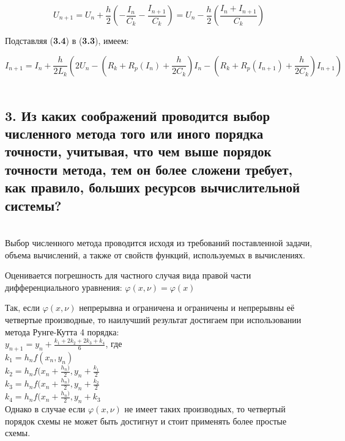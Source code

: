 \begin{equation}
    U_{n + 1} = U_{n} + \frac{h}{2}(-\frac{I_{n}}{C_{k}} -\frac{I_{n + 1}}{C_{k}}) = U_{n} - \frac{h}{2}(\frac{I_{n} + I_{n + 1}}{C_{k}})
\end{equation}

Подставляя (\textbf{3.4}) в (\textbf{3.3}), имеем:

\begin{equation}
    I_{n + 1} = I_{n} + \frac{h}{2L_{k}}(2U_{n} -  (R_{k} + R_{p}(I_{n}) + \frac{h}{2C_{k}})I_{n} - (R_{k} + R_{p}(I_{n + 1}) + \frac{h}{2C_{k}})I_{n+1})
\end{equation}\\

\subsection*{3. Из каких соображений проводится выбор численного метода того или иного порядка точности, учитывая, что чем выше порядок точности метода, тем он более сложени требует, как правило, больших ресурсов вычислительной системы?}\\

Выбор численного метода проводится исходя из требований поставленной задачи, объема вычислений, а также от свойств функций, используемых в вычислениях.

Оценивается погрешность для частного случая вида правой части дифференциального уравнения: $\varphi (x, \nu) = \varphi(x)$

Так, если $\varphi (x, \nu)$ непрерывна и ограничена и ограничены и непрерывны её четвертые производные, то наилучший результат достигаем при использовании метода Рунге-Кутта 4 порядка:\\

$y_{n + 1} = y_{n} + \frac{k_{1} + 2k_{2} + 2k_{3} + k_{4}}{6}$, где\\

$k_{1} = h_{n} f(x_{n}, y_{n})$\\
\indent $k_{2} = h_{n}f(x_{n} + \frac{h_{n})}{2}, y_{n} + \frac{k_{1}}{2}$\\
\indent $k_{3} = h_{n}f(x_{n} + \frac{h_{n})}{2}, y_{n} + \frac{k_{2}}{2}$\\
\indent $k_{4} = h_{n}f(x_{n} + \frac{h_{n})}{2}, y_{n} + k_{3}$\\

Однако в случае если $\varphi (x, \nu)$ не имеет таких производных, то четвертый порядок схемы не может быть достигнут и стоит применять более простые схемы.

